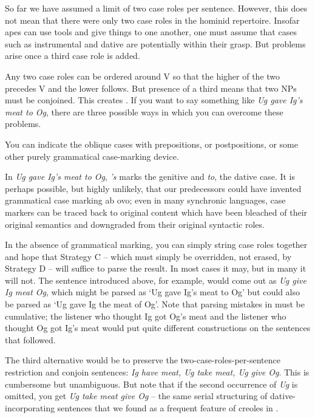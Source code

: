 So far we have assumed a limit of two case roles per sentence. However, this does not mean that there were only two case roles in the hominid repertoire. Insofar apes can use tools and give things to one another, one must assume that cases such as instrumental and dative are potentially within their grasp. But problems arise once a third case role is added.

Any two case roles can be ordered around V so that the higher of the two precedes V and the lower follows. But presence of a third means that two NPs must be conjoined. This creates . If you want to say something like \textit{Ug gave Ig's meat to Og}, there are three possible ways in which you can overcome these problems.

You can indicate the oblique cases with prepositions, or postpositions, or some other purely grammatical case-marking device.

In \textit{Ug gave Ig's meat to Og}, \textit{'s} marks the genitive and \textit{to}, the dative case. It is perhaps possible, but highly unlikely, that our predecessors could have invented grammatical case marking ab ovo; even in many synchronic languages, case markers can be traced back to original content which have been bleached of their original semantics and downgraded from their original syntactic roles.

In the absence of grammatical marking, you can simply string case roles together and hope that Strategy C -- which must simply be overridden, not erased, by Strategy D -- will suffice to parse the result. In most cases it may, but in many it will not. The sentence introduced above, for example, would come out as \textit{Ug give Ig meat Og}, which might be parsed as `Ug gave Ig's meat to Og' but could also be parsed as `Ug gave Ig the meat of Og'. Note that parsing mistakes in  must be cumulative; the listener who thought Ig got Og's meat and the listener who thought Og got Ig's meat would put quite different constructions on the sentences that followed.

The third alternative would be to preserve the two-case-roles-per-sentence restriction and conjoin sentences: \textit{Ig have meat, Ug take meat, Ug give Og}. This is cumbersome but unambiguous. But note that if the second occurrence of \textit{Ug} is omitted, you get \textit{Ug take meat give Og} -- the same serial structuring of dative-incorporating sentences that we found as a frequent feature of creoles in .

